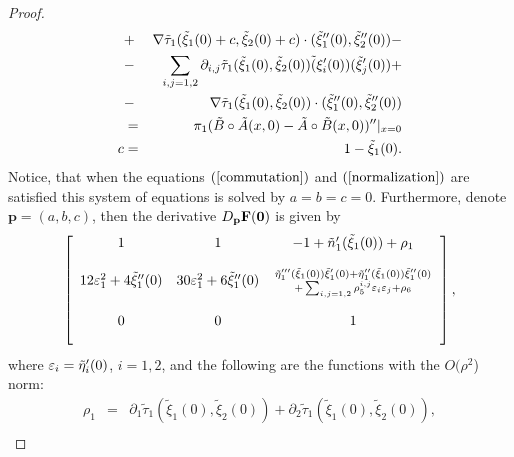 \begin{proof}
\begin{eqnarray}
\nonumber &+& \nabla \tilde \tau_1(\tilde \xi_1(0)+c,\tilde \xi_2(0)+c) \cdot (\tilde \xi_1''(0), \tilde \xi_2''(0))-\\
\nonumber&-&\sum_{i,j=1,2}\partial_{i,j}\tilde \tau_1(\tilde \xi_1(0),\tilde \xi_2(0)) \tilde (\xi_i'(0)) (\tilde \xi_j'(0))+\\
\nonumber &-& \nabla \tilde \tau_1(\tilde \xi_1(0),\tilde \xi_2(0)) \cdot (\tilde \xi_1''(0), \tilde \xi_2''(0))\\
\nonumber & =& \pi_1( \tilde B \circ \tilde A(x,0)- \tilde A \circ \tilde B(x,0))''\arrowvert_{x=0} \\
\nonumber c&=&1-\tilde \xi_1(0).
\end{eqnarray}
Notice, that when the  equations $(\ref{commutation})$ and $(\ref{normalization})$ are satisfied this system of equations is solved by $a=b=c=0$. Furthermore, denote $\mathbf{p}=(a,b,c)$, then the derivative $D_{\mathbf p} \mathbf{F}(\mathbf 0)$ is given by
$$
\left[
\begin{array}{c c c }
\vspace{4mm}
1 & 1 & -1+\tilde n _1'(\tilde \xi_1(0)) +\rho_1 \\
\vspace{4mm}
12 \vareps_1^2 + 4 \tilde \xi_1''(0) & 30 \vareps_1^2 +6 \tilde \xi_1''(0) & {\tilde \eta_1'''( \tilde \xi_1(0) ) \tilde \xi_1'(0)+  \tilde \eta_1''( \tilde \xi_1(0) ) \tilde \xi_1''(0)\atop +\sum_{i,j=1,2}\rho_5^{i,j} \vareps_i \vareps_j +\rho_6}\\ 
\vspace{4mm}
0 & 0  & 1
\end{array}
\right],
$$
where $\varepsilon_i=\tilde \eta_i'(0)$, $i=1,2$, and the following are the functions with the $O(\rho^2$) norm:
\begin{eqnarray}
\nonumber  \rho_1&=&\partial_1 \tilde \tau_1(\tilde \xi_1(0), \tilde \xi_2(0))+\partial_2 \tilde \tau_1(\tilde \xi_1(0), \tilde \xi_2(0)),\\

\end{eqnarray}
\end{proof}
